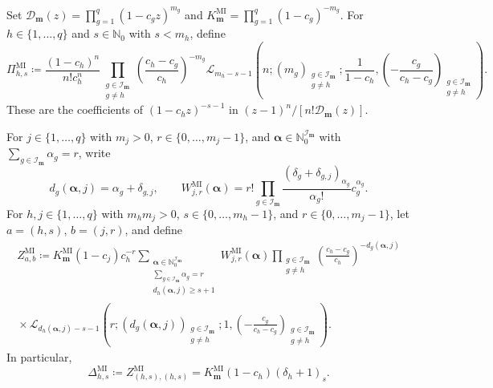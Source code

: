 \documentclass[10pt]{amsart}
\newcommand{\Nzero}{\mathbb N_0}
\newcommand{\mm}{\boldsymbol m}
\theoremstyle{plain}
\theoremstyle{definition}
\theoremstyle{remark}
\begin{document}
Set \(\mathcal D_{\boldsymbol m}(z)=\prod_{g=1}^q(1-c_gz)^{m_g}\) and
\(K_{\mm}^{\mathrm{MI}}=\prod_{g=1}^q(1-c_g)^{-m_g}\).
For \(h\in\{1,\ldots,q\}\) and \(s\in\Nzero\) with \(s<m_h\), define
\begin{equation}
 \Pi_{h,s}^{\mathrm{MI}}
 \coloneq
 \frac{(1-c_h)^n}{n!c_h^n}
 \prod_{\substack{g\in\mathcal I_{\boldsymbol m}\\g\ne h}}
 \left(\frac{c_h-c_g}{c_h}\right)^{-m_g}
 \mathscr L_{m_h-s-1}
 \left(
 n;(m_g)_{\substack{g\in\mathcal I_{\boldsymbol m}\\g\ne h}};
 \frac1{1-c_h},
 \left(-\frac{c_g}{c_h-c_g}\right)_{
       \substack{g\in\mathcal I_{\boldsymbol m}\\g\ne h}}
 \right).
 \label{eq:typeI-MI-Pi}
\end{equation}
These are the coefficients of
\((1-c_hz)^{-s-1}\) in
\((z-1)^n/[n!\mathcal D_{\boldsymbol m}(z)]\).

For \(j\in\{1,\ldots,q\}\) with \(m_j>0\),
\(r\in\{0,\ldots,m_j-1\}\), and
\(\boldsymbol\alpha\in\mathbb N_0^{\mathcal I_{\boldsymbol m}}\) with
\(\sum_{g\in\mathcal I_{\boldsymbol m}}\alpha_g=r\), write
\[
 d_g(\boldsymbol\alpha,j)=\alpha_g+\delta_{g,j},\qquad
 W_{j,r}^{\mathrm{MI}}(\boldsymbol\alpha)
 =r!\prod_{g\in\mathcal I_{\boldsymbol m}}
 \frac{(\delta_g+\delta_{g,j})_{\alpha_g}}{\alpha_g!}
 c_g^{\alpha_g}.
\]
For \(h,j\in\{1,\ldots,q\}\) with \(m_hm_j>0\),
\(s\in\{0,\ldots,m_h-1\}\), and
\(r\in\{0,\ldots,m_j-1\}\), let \(a=(h,s)\), \(b=(j,r)\), and define
\begin{multline}
 Z_{a,b}^{\mathrm{MI}}
 \coloneq
 K_{\mm}^{\mathrm{MI}}(1-c_j)c_h^{-r}
 \sum_{\substack{\boldsymbol\alpha\in\mathbb N_0^{\mathcal I_{\boldsymbol m}}\\
 \sum_{g\in\mathcal I_{\boldsymbol m}}\alpha_g=r\\
 d_h(\boldsymbol\alpha,j)\ge s+1}}
 W_{j,r}^{\mathrm{MI}}(\boldsymbol\alpha)
 \prod_{\substack{g\in\mathcal I_{\boldsymbol m}\\g\ne h}}
 \left(\frac{c_h-c_g}{c_h}\right)^{-d_g(\boldsymbol\alpha,j)}
 \\
 {}\times
 \mathscr L_{d_h(\boldsymbol\alpha,j)-s-1}
 \left(
 r;(d_g(\boldsymbol\alpha,j))_{
      \substack{g\in\mathcal I_{\boldsymbol m}\\g\ne h}};
 1,
 \left(-\frac{c_g}{c_h-c_g}\right)_{
       \substack{g\in\mathcal I_{\boldsymbol m}\\g\ne h}}
 \right).
 \label{eq:typeI-MI-Z}
\end{multline}
In particular,
\begin{equation}
 \Delta_{h,s}^{\mathrm{MI}}
 \coloneq Z_{(h,s),(h,s)}^{\mathrm{MI}}
 =K_{\mm}^{\mathrm{MI}}(1-c_h)(\delta_h+1)_s.
 \label{eq:typeI-MI-Delta}
\end{equation}
\end{document}
